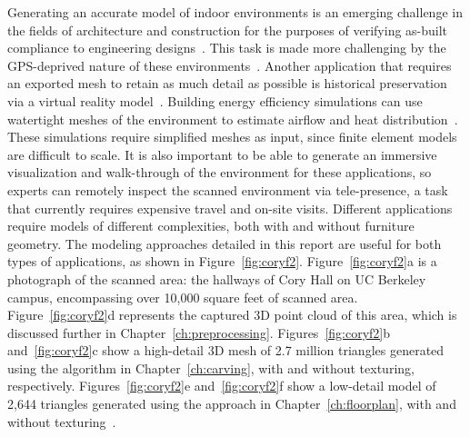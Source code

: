 \documentclass[12pt,onecolumn,oneside]{book}
\begin{document}
Generating an accurate model of indoor environments is an emerging challenge in the fields of architecture and construction for the purposes of verifying as-built compliance to engineering designs~\cite{Bosche10,Xiong13}.  This task is made more challenging by the GPS-deprived nature of these environments~\cite{Liang13}.  Another application that requires an exported mesh to retain as much detail as possible is historical preservation via a virtual reality model~\cite{VillageHeritage,Carving}.  Building energy efficiency simulations can use watertight meshes of the environment to estimate airflow and heat distribution~\cite{EnergyPlus}.  These simulations require simplified meshes as input, since finite element models are difficult to scale.  It is also important to be able to generate an immersive visualization and walk-through of the environment for these applications, so experts can remotely inspect the scanned environment via tele-presence, a task that currently requires expensive travel and on-site visits.  Different applications require models of different complexities, both with and without furniture geometry.  The modeling approaches detailed in this report are useful for both types of applications, as shown in Figure~\ref{fig:coryf2}.  Figure~\ref{fig:coryf2}a is a photograph of the scanned area: the hallways of Cory Hall on UC Berkeley campus, encompassing over 10,000 square feet of scanned area.  Figure~\ref{fig:coryf2}d represents the captured 3D point cloud of this area, which is discussed further in Chapter~\ref{ch:preprocessing}.  Figures~\ref{fig:coryf2}b and~\ref{fig:coryf2}c show a high-detail 3D mesh of 2.7 million triangles generated using the algorithm in Chapter~\ref{ch:carving}, with and without texturing, respectively.  Figures~\ref{fig:coryf2}e and~\ref{fig:coryf2}f show a low-detail model of 2,644 triangles generated using the approach in Chapter~\ref{ch:floorplan}, with and without texturing~\cite{Turner14Journal}.
\end{document}

